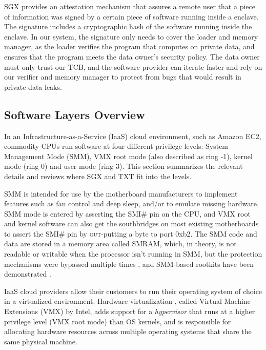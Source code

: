 SGX provides an attestation mechanism that assures a remote user that a piece
of information was signed by a certain piece of software running inside a
enclave. The signature includes a cryptographic hash of the software running
inside the enclave. In our system, the signature only needs to cover the loader
and memory manager, as the loader verifies the program that computes on
private data, and ensures that the program meets the data owner's security
policy. The data owner must only trust our TCB, and the software provider can
iterate faster and rely on our verifier and memory manager to protect from
bugs that would result in private data leaks.


\subsection{Software Layers Overview}

In an Infrastructure-as-a-Service (IaaS) cloud environment, such as Amazon EC2,
commodity CPUs run software at four different privilege levels: System
Management Mode (SMM), VMX root mode (also described as ring -1), kernel mode
(ring 0) and user mode (ring 3). This section summarizes the relevant details
and reviews where SGX and TXT fit into the levels.

SMM is intended for use by the motherboard manufacturers to implement features
such as fan control and deep sleep, and/or to emulate missing hardware. SMM
mode is entered by asserting the SMI# pin on the CPU, and VMX root and kernel
software can also get the southbridges on most existing motherboards to assert
the SMI# pin by \textsc{out}-putting a byte to port 0xb2. The SMM code and data
are stored in a memory area called SMRAM, which, in theory, is not readable or
writable when the processor isn't running in SMM, but the protection mechanisms
were bypassed multiple times \cite{duflot2006smm} \cite{rutkowska2008remap}
\cite{wojtczuk2009smm}, and SMM-based rootkits have been demonstrated
\cite{wecherowski2009smm} \cite{wecherowski2009smm}.

IaaS cloud providers allow their customers to run their operating system of
choice in a virtualized environment. Hardware virtualization
\cite{uhlig2005intel}, called Virtual Machine Extensions (VMX) by Intel,
adds support for a \textit{hypervisor} that runs at a higher privilege level
(VMX root mode) than OS kernels, and is responsible for allocating hardware
resources across multiple operating systems that share the same physical
machine.

